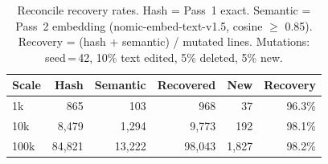 \begin{table}[b]
	\centering
	\footnotesize
	\caption{Reconcile recovery rates. Hash = Pass~1 exact. Semantic = Pass~2 embedding (nomic-embed-text-v1.5, cosine $\geq$ 0.85). Recovery = (hash + semantic) / mutated lines. Mutations: seed\,=\,42, 10\% text edited, 5\% deleted, 5\% new.}
	\label{tab:reconcile}
	\setlength{\tabcolsep}{4pt}
	\begin{tabular}{@{}lrrrrr@{}}
		\toprule
		Scale & Hash & Semantic & Recovered & New & Recovery \\
		\midrule
		1k    & 865   & 103   & 968   & 37  & 96.3\%   \\
		10k   & 8,479 & 1,294 & 9,773 & 192 & 98.1\%   \\
		100k  & 84,821 & 13,222 & 98,043 & 1,827 & 98.2\%   \\
		\bottomrule
	\end{tabular}
\end{table}
